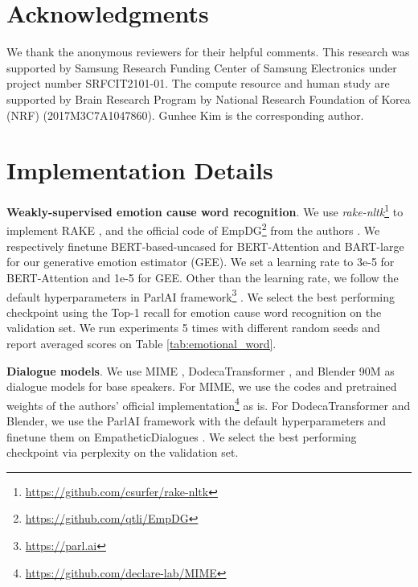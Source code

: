 \documentclass[11pt]{article}
\begin{document}
\section*{Acknowledgments}

We thank the anonymous reviewers for their helpful comments.
This research was supported by Samsung Research Funding Center of Samsung Electronics under project number SRFCIT2101-01.
The compute resource and human study are supported by Brain Research Program by National Research Foundation of Korea (NRF) (2017M3C7A1047860).
Gunhee Kim is the corresponding author.







\clearpage

\appendix

\section{Implementation Details}
\label{sec:implementation_detail}

\textbf{Weakly-supervised emotion cause word recognition}.
We use \textit{rake-nltk}\footnote{\url{https://github.com/csurfer/rake-nltk}} to implement RAKE \citep{Rose:2010:rake},
and the official code of EmpDG\footnote{\url{https://github.com/qtli/EmpDG}} from the authors \citep{Li:2020:COLING}.
We respectively finetune BERT-based-uncased \citep{Devlin:2019:NAACL} for BERT-Attention and BART-large \citep{Lewis:2020:ACL} for our generative emotion estimator (GEE).
We set a learning rate to 3e-5 for BERT-Attention and 1e-5 for GEE.
Other than the learning rate, we follow the default hyperparameters in ParlAI framework\footnote{\url{https://parl.ai}} \citep{Miller:2017:arxiv}.
We select the best performing checkpoint using the Top-1 recall for emotion cause word recognition on the validation set.
We run experiments 5 times with different random seeds and report averaged scores on Table \ref{tab:emotional_word}.

\textbf{Dialogue models}.
We use MIME \citep{Majumder:2020:EMNLP}, DodecaTransformer \citep{Shuster:2020:ACL}, and Blender 90M \citep{Roller:2021:EACL} as dialogue models for base speakers.
For MIME, we use the codes and pretrained weights of the authors' official implementation\footnote{\url{https://github.com/declare-lab/MIME}} as is.
For DodecaTransformer and Blender, we use the ParlAI framework with the default hyperparameters and finetune them on EmpatheticDialogues \citep{Rashkin:2019:ACL}.
We select the best performing checkpoint via perplexity on the validation set.
\end{document}
